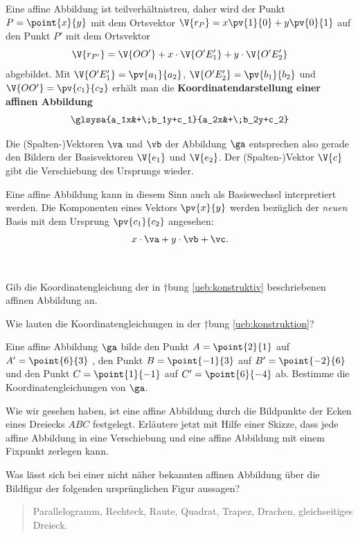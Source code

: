 \documentclass[%
11pt,%
twoside,%
titlepage,%
german,%
headsepline%
]{scrartcl}
\begin{document}
Eine affine Abbildung ist teilverhältnistreu, daher wird der Punkt $P = \point{x}{y}$ mit dem Ortsvektor $\V{r_P}=x\pv{1}{0}+y\pv{0}{1}$ auf den Punkt $P'$ mit dem Ortsvektor
$$\V{r_{P'}}=\V{OO'}+x\cdot\V{O'E'_1}+y\cdot\V{O'E'_2}$$
abgebildet. Mit $\V{O'E'_1}=\pv{a_1}{a_2}$, $\V{O'E'_2}=\pv{b_1}{b_2}$ und $\V{OO'}=\pv{c_1}{c_2}$ erhält man die \textbf{Koordinatendarstellung einer affinen Abbildung}
$$\glsysa{a_1x&+\;b_1y+c_1}{a_2x&+\;b_2y+c_2}$$

\begin{bem}
Die (Spalten-)Vektoren $\va$ und $\vb$ der Abbildung $\ga$ entsprechen also gerade den Bildern der Basisvektoren $\V{e_1}$ und $\V{e_2}$. Der (Spalten-)Vektor $\V{c}$ gibt die Verschiebung des Ursprungs wieder.
\end{bem}

\begin{bem}
Eine affine Abbildung kann in diesem Sinn auch als Basiswechsel interpretiert werden. Die Komponenten eines Vektors $\pv{x}{y}$ werden bezüglich der \emph{neuen} Basis mit dem Ursprung $\pv{c_1}{c_2}$ angesehen:
$$x\cdot\va+y\cdot\vb+\vc.$$
\end{bem}

\begin{ueb}
\ \\[-4ex]
\begin{enumeratea}
\item Gib die Koordinatengleichung der in †bung \ref{ueb:konstruktiv} beschriebenen affinen Abbildung an.
\item Wie lauten die Koordinatengleichungen in der †bung \ref{ueb:konstruktion}?
\item Eine affine Abbildung $\ga$ bilde den Punkt $A = \point{2}{1}$ auf $A'= \point{6}{3}$ , den Punkt $B=\point{-1}{3}$ auf $B'=\point{-2}{6}$ und den Punkt $C=\point{1}{-1}$ auf $C'=\point{6}{-4}$ ab. Bestimme die Koordinatengleichungen von $\ga$.
\item Wie wir gesehen haben, ist eine affine Abbildung durch die Bildpunkte der Ecken eines Dreiecks $ABC$ festgelegt. Erläutere jetzt mit Hilfe einer Skizze, dass jede affine Abbildung in eine Verschiebung und eine affine Abbildung mit einem Fixpunkt zerlegen kann.
\end{enumeratea}
\end{ueb}

\begin{ueb}
Was lässt sich bei einer nicht näher bekannten affinen Abbildung über die Bildfigur der folgenden ursprünglichen Figur aussagen?
\begin{quote}
Parallelogramm, Rechteck, Raute, Quadrat, Trapez, Drachen, gleichseitiges Dreieck.
\end{quote}
\end{ueb}
\end{document}
